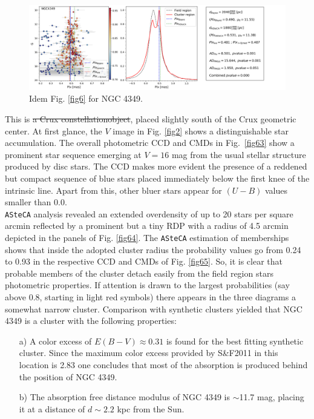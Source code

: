 \documentclass[draft]{aa}
\providecommand{\DIFaddtex}[1]{{\protect\color{blue}\uwave{#1}}} %
\providecommand{\DIFdeltex}[1]{{\protect\color{red}\sout{#1}}}                      %
\providecommand{\DIFaddbegin}{} %
\providecommand{\DIFaddend}{} %
\providecommand{\DIFdelbegin}{} %
\providecommand{\DIFdelend}{} %
\providecommand{\DIFadd}[1]{\texorpdfstring{\DIFaddtex{#1}}{#1}} %
\providecommand{\DIFdel}[1]{\texorpdfstring{\DIFdeltex{#1}}{}} %
\newcommand{\DIFscaledelfig}{0.5}
\newlength{\DIFdelgraphicswidth} %
\newlength{\DIFdelgraphicsheight} %
\newcommand{\DIFaddincludegraphics}[2][]{{\color{blue}\fbox{\DIFOincludegraphics[#1]{#2}}}} %
\newcommand{\DIFdelincludegraphics}[2][]{%
\sbox{\DIFdelgraphicsbox}{\DIFOincludegraphics[#1]{#2}}%
\settoboxwidth{\DIFdelgraphicswidth}{\DIFdelgraphicsbox} %
\settoboxtotalheight{\DIFdelgraphicsheight}{\DIFdelgraphicsbox} %
\scalebox{\DIFscaledelfig}{%
\parbox[b]{\DIFdelgraphicswidth}{\usebox{\DIFdelgraphicsbox}\\[-\baselineskip] \rule{\DIFdelgraphicswidth}{0em}}\llap{\resizebox{\DIFdelgraphicswidth}{\DIFdelgraphicsheight}{%
\setlength{\unitlength}{\DIFdelgraphicswidth}%
\begin{picture}(1,1)%
\thicklines\linethickness{2pt} %
{\color[rgb]{1,0,0}\put(0,0){\framebox(1,1){}}}%
{\color[rgb]{1,0,0}\put(0,0){\line( 1,1){1}}}%
{\color[rgb]{1,0,0}\put(0,1){\line(1,-1){1}}}%
\end{picture}%
}\hspace*{3pt}}} %
} %
\DeclareRobustCommand{\DIFaddbegin}{\DIFOaddbegin \let\includegraphics\DIFaddincludegraphics} %
\DeclareRobustCommand{\DIFaddend}{\DIFOaddend \let\includegraphics\DIFOincludegraphics} %
\DeclareRobustCommand{\DIFdelbegin}{\DIFOdelbegin \let\includegraphics\DIFdelincludegraphics} %
\DeclareRobustCommand{\DIFdelend}{\DIFOaddend \let\includegraphics\DIFOincludegraphics} %
\begin{document}
\begin{figure}[ht]
    \centering
    \includegraphics[width=\hsize]{../figs/plx_NGC4349.png}
    \caption{Idem Fig. \ref{fig6} for NGC 4349.}
    \label{fig66}
\end{figure}


This is \DIFdelbegin \DIFdel{a Crux constellationobject}\DIFdelend \DIFaddbegin \DIFadd{an object in the Crux constellation}\DIFaddend , placed slightly south of the Crux geometric
center. At first glance, the $V$ image in Fig. \ref{fig2} shows a
distinguishable star accumulation. The overall photometric CCD and CMDs in
Fig.~\ref{fig63} show a prominent star sequence emerging at $V=16$ mag from the
usual stellar structure produced by disc stars. The CCD makes more evident the
presence of a reddened but compact sequence of blue stars placed immediately
below the first knee of the intrinsic line. Apart from this, other bluer stars
appear for $(U-B)$ values smaller than 0.0.\\ 

\texttt{ASteCA} analysis revealed an extended overdensity of up to 20 stars per
square arcmin reflected by a prominent but a tiny RDP with a radius of 4.5
arcmin depicted in the panels of Fig. \ref{fig64}.
The \texttt{ASteCA} estimation of memberships shows that inside the adopted
cluster radius the probability values go from 0.24 to 0.93 in the respective
CCD and CMDs of Fig. \ref{fig65}. So, it is clear that probable members of the
cluster detach easily from the field region stars photometric properties. If
attention is drawn to the largest probabilities (say above 0.8, starting in
light red symbols) there appears in the three diagrams a somewhat narrow
cluster. Comparison with synthetic clusters yielded that NGC 4349 is a cluster
with the following properties:

\begin{itemize}
    \item [a)] A color excess of $E(B-V)\approx0.31$ is found for the best
    fitting synthetic cluster. Since the maximum color excess provided by
    S\&F2011 in this location is 2.83 one concludes that most of the
    absorption is produced behind the position of NGC 4349.
    \item [b)] The absorption free distance modulus of NGC 4349 is $\sim$11.7
    mag, placing it at a distance of $d\sim2.2$ kpc from the Sun. 
\end{itemize}
\end{document}
